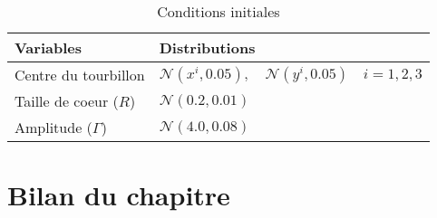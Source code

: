 \begin{table}[htbp]
    \centering
    \caption{Conditions initiales}
    \begin{tabular}[t]{|l|l|}
        \hline
        Variables             & Distributions                                                        \\
        \hline
        Centre du tourbillon  & $\mathcal N(x^i,0.05), \quad \mathcal N(y^i,0.05) \quad i = {1,2,3}$ \\
        Taille de coeur ($R$) & $\mathcal N(0.2, 0.01)$                                              \\
        Amplitude ($\Gamma$)  & $\mathcal N(4.0, 0.08)$                                              \\
        \hline
    \end{tabular}
    \label{tab:init_three_vortex}
\end{table}

\section{Bilan du chapitre}
